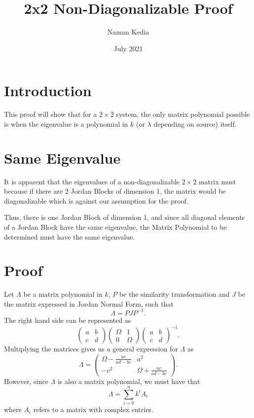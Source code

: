 \documentclass{article}
\title{2x2 Non-Diagonalizable Proof}
\author{Naman Kedia }
\date{July 2021}
\begin{document}
\maketitle

\section{Introduction}
This proof will show that for a $2 \times 2$ system, the only matrix polynomial possible is when the eigenvalue is a polynomial in $k$ (or $\lambda$ depending on source) itself.

\section{Same Eigenvalue}
It is apparent that the eigenvalues of a non-diagonalizable $2 \times 2$ matrix must because if there are 2 Jordan Blocks of dimension 1, the matrix would be diagonalizable which is against our assumption for the proof.

Thus, there is one Jordan Block of dimension 1, and since all diagonal elements of a Jordan Block have the same eigenvalue, the Matrix Polynomial to be determined must have the same eigenvalue.

\section{Proof}
Let $\Lambda$ be a matrix polynomial in $k$, $P$ be the similarity transformation and $J$ be the matrix expressed in Jordan Normal Form, such that
$$\Lambda = PJP^{-1}.$$
The right hand side can be represented as
$$\left(\begin{array}{cc}
    a & b \\
    c & d
\end{array}\right)
\left(\begin{array}{cc}
    \Omega & 1 \\
    0 & \Omega
\end{array}\right)
\left(\begin{array}{cc}
    a & b \\
    c & d
\end{array}\right)^{-1}.$$
Multiplying the matrices gives us a general expression for $\Lambda$ as 
$$\Lambda = \left(\begin{array}{cc}
    \Omega - \frac{ac}{ad-bc} & a^2 \\
    -c^2 & \Omega + \frac{ac}{ad-bc}
\end{array}\right).$$
However, since $\Lambda$ is also a matrix polynomial, we must have that
$$\Lambda = \sum_{i=0}^{n} k^i A_i$$
where $A_i$ refers to a matrix with complex entries.
\end{document}
